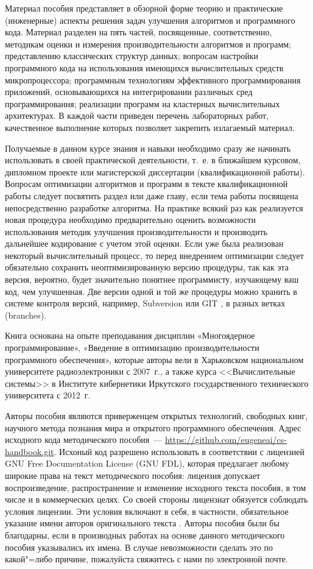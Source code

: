 \documentclass[14pt, a4paper, openany, twoside, draft]{extbook} %
\begin{document}
Материал пособия представляет в обзорной форме теорию и практические (инженерные) аспекты решения задач улучшения алгоритмов и программного кода.  Материал разделен на пять частей, посвященные, соответственно, методикам оценки и измерения производительности алгоритмов и программ; представлению классических структур данных; вопросам настройки программного кода на использования имеющихся вычислительных средств микропроцессора; программным технологиям эффективного программирования приложений, основывающихся на интегрировании различных сред программирования; реализации программ на кластерных вычислительных архитектурах.  В каждой части приведен перечень лабораторных работ, качественное выполнение которых позволяет закрепить излагаемый материал.

Получаемые в данном курсе знания и навыки необходимо сразу же начинать использовать в своей практической деятельности, т.~е. в ближайшем курсовом, дипломном проекте или магистерской диссертации (квалификационной работы).  Вопросам оптимизации алгоритмов и программ в тексте квалификационной работы следует посвятить раздел или даже главу, если тема работы посвящена непосредственно разработке алгоритма.  На практике всякий раз как реализуется новая процедура необходимо предварительно оценить возможности использования методик улучшения производительности и производить дальнейшее кодирование с учетом этой оценки.  Если уже была реализован некоторый вычислительный процесс, то перед внедрением оптимизации следует обязательно сохранить неоптимизированную версию процедуры, так как эта версия, вероятно, будет значительно понятнее программисту, изучающему ваш код, чем улучшенная.  Две версии одной и той же процедуры можно хранить в системе контроля версий, например, Subversion \cite{svn} или GIT \cite{git}, в разных ветках (branches).

Книга основана на опыте преподавания дисциплин «Многоядерное программирование», «Введение в оптимизацию производительности программного обеспечения», которые авторы вели в Харьковском национальном университете радиоэлектроники с 2007~г., а также курса <<Вычислительные системы>> в Институте кибернетики Иркутского государственного технического университета с 2012~г.

Авторы пособия являются приверженцем открытых технологий, свободных книг, научного метода познания мира и открытого программного обеспечения.  Адрес исходного кода методического пособия~--- \url{https://github.com/eugeneai/cs-handbook.git}. Исхоный код разрешено использовать в соответствии с лицензией \foreignlanguage{english}{GNU Free Documentation License (GNU FDL)}, которая предлагает любому широкие права на текст методического пособия: лицензия допускает воспроизведение, распространение и изменение исходного текста пособия, в том числе и в коммерческих целях.  Со своей стороны лицензиат обязуется соблюдать условия лицензии.  Эти условия включают в себя, в частности, обязательное указание имени авторов оригинального текста \cite{GNUFDL}.  Авторы пособия были бы благодарны, если в производных работах на основе данного методического пособия указывались их имена.  В случае невозможности сделать это по какой"=либо причине, пожалуйста свяжитесь с нами по электронной почте.
\end{document}
